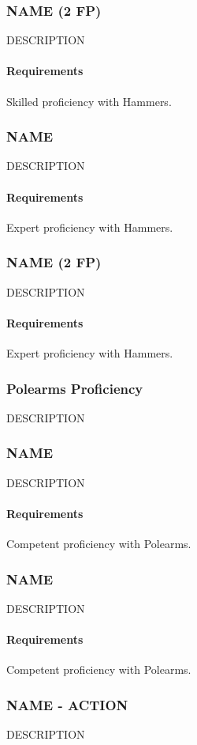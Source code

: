 \subsubsection{NAME (2 FP)} \label{feat::name}
    DESCRIPTION
    \paragraph{Requirements} Skilled proficiency with Hammers.
\subsubsection{NAME} \label{feat::name}
    DESCRIPTION
    \paragraph{Requirements} Expert proficiency with Hammers.
\subsubsection{NAME (2 FP)} \label{feat::name}
    DESCRIPTION
    \paragraph{Requirements} Expert proficiency with Hammers.
\subsubsection{Polearms Proficiency} \label{feat::name}
    DESCRIPTION
\subsubsection{NAME} \label{feat::name}
    DESCRIPTION
    \paragraph{Requirements} Competent proficiency with Polearms.
\subsubsection{NAME} \label{feat::name}
    DESCRIPTION
    \paragraph{Requirements} Competent proficiency with Polearms.
\subsubsection{NAME - ACTION} \label{feat::name}
    DESCRIPTION
